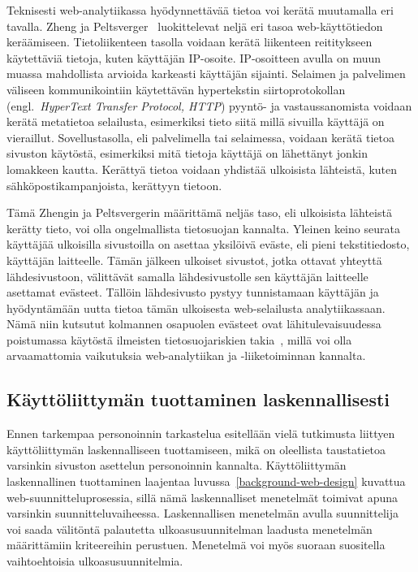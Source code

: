 \documentclass[finnish, 12pt, a4paper, elec, utf8, a-1b]{aaltothesis}
\begin{document}
Teknisesti web-analytiikassa hyödynnettävää tietoa voi kerätä muutamalla eri
tavalla. Zheng ja Peltsverger~\cite{zheng2015web} luokittelevat neljä eri tasoa
web-käyttötiedon keräämiseen. Tietoliikenteen tasolla voidaan kerätä liikenteen
reititykseen käytettäviä tietoja, kuten käyttäjän IP-osoite. IP-osoitteen avulla
on muun muassa mahdollista arvioida karkeasti käyttäjän sijainti. Selaimen ja
palvelimen väliseen kommunikointiin käytettävän hypertekstin siirtoprotokollan
(engl.~\textit{HyperText Transfer Protocol, HTTP}) pyyntö- ja vastaussanomista
voidaan kerätä metatietoa selailusta, esimerkiksi tieto siitä millä sivuilla
käyttäjä on vieraillut. Sovellustasolla, eli palvelimella tai selaimessa,
voidaan kerätä tietoa sivuston käytöstä, esimerkiksi mitä tietoja käyttäjä on
lähettänyt jonkin lomakkeen kautta. Kerättyä tietoa voidaan yhdistää ulkoisista
lähteistä, kuten sähköpostikampanjoista, kerättyyn tietoon.

Tämä Zhengin ja Peltsvergerin määrittämä neljäs taso, eli ulkoisista lähteistä
kerätty tieto, voi olla ongelmallista tietosuojan kannalta. Yleinen keino
seurata käyttäjää ulkoisilla sivustoilla on asettaa yksilöivä eväste, eli pieni
tekstitiedosto, käyttäjän laitteelle. Tämän jälkeen ulkoiset sivustot, jotka
ottavat yhteyttä lähdesivustoon, välittävät samalla lähdesivustolle sen
käyttäjän laitteelle asettamat evästeet. Tällöin lähdesivusto pystyy
tunnistamaan käyttäjän ja hyödyntämään uutta tietoa tämän ulkoisesta
web-selailusta analytiikassaan. Nämä niin kutsutut kolmannen osapuolen evästeet
ovat lähitulevaisuudessa poistumassa käytöstä ilmeisten tietosuojariskien
takia~\cite{third-party-cookies-phaseout}, millä voi olla arvaamattomia
vaikutuksia web-analytiikan ja -liiketoiminnan kannalta.

\subsection{Käyttöliittymän tuottaminen laskennallisesti}

Ennen tarkempaa personoinnin tarkastelua esitellään vielä tutkimusta liittyen
käyttöliittymän laskennalliseen tuottamiseen, mikä on oleellista taustatietoa
varsinkin sivuston asettelun personoinnin kannalta. Käyttöliittymän
laskennallinen tuottaminen laajentaa luvussa~\ref{background-web-design}
kuvattua web-suunnitteluprosessia, sillä nämä laskennalliset menetelmät toimivat
apuna varsinkin suunnitteluvaiheessa. Laskennallisen menetelmän avulla
suunnittelija voi saada välitöntä palautetta ulkoasusuunnitelman laadusta
menetelmän määrittämiin kriteereihin perustuen. Menetelmä voi myös suoraan
suositella vaihtoehtoisia ulkoasusuunnitelmia.
\end{document}
